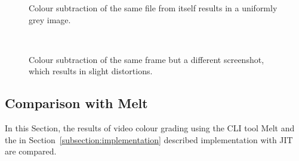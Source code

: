 \documentclass[../MasterThesis.tex]{subfiles}
\begin{document}
\begin{minipage}{0.48\textwidth}
	
	\begin{figure}[H]
		\begin{center}
			\caption[Colour subtraction of the same file from itself.]{Colour subtraction of the same file from itself results in a uniformly grey image.}
			\label{figure:greyresult_unit}
		\end{center}
	\end{figure}
\end{minipage}\begin{minipage}{0.04\textwidth}
	\ 
\end{minipage}\begin{minipage}{0.48\textwidth}	
	\begin{figure}[H]
		\begin{center}
			\caption[Colour subtraction of the same frame but a different screenshot.]{Colour subtraction of the same frame but a different screenshot, which results in slight distortions.}
			\label{figure:greyresult_blurry}
		\end{center}
	\end{figure}
\end{minipage}









\subsection{Comparison with Melt} \label{section:comparisonMelt}


In this Section, the results of video colour grading using the CLI tool Melt and the in Section~\ref{subsection:implementation} described implementation with JIT are compared. 
\end{document}
